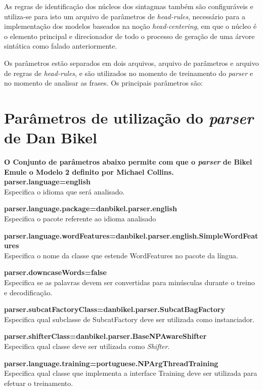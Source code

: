 As regras de identificação dos núcleos dos sintagmas também são configuráveis e utiliza-se para isto um arquivo de parâmetros de \emph{head-rules}, necessário para a implementação dos modelos baseados na noção \emph{head-centering}, em que o núcleo é o elemento principal e direcionador de todo o processo de geração de uma árvore sintática como falado anteriormente.

Os parâmetros estão separados em dois arquivos, arquivo de parâmetros e arquivo de regras de \emph{head-rules}, e são utilizados no momento de treinamento do \emph{parser} e no momento de analisar as frases. Os principais parâmetros são:

\section{Parâmetros de utilização do \emph{parser} de Dan Bikel}
\label{sec:bikelest_param}

\scriptsize

\textbf{O Conjunto de parâmetros abaixo permite com que o \emph{parser} de Bikel Emule o Modelo 2 definito por Michael Collins.}\\

\textbf{parser.language=english}\\
Especifica o idioma que será analisado.

\textbf{parser.language.package=danbikel.parser.english}\\
Especifica o pacote referente ao idioma analisado

\textbf{parser.language.wordFeatures=danbikel.parser.english.SimpleWordFeatures}\\
Especifica o nome da classe que estende WordFeatures no pacote da língua.

\textbf{parser.downcaseWords=false}\\
Especifica se as palavras devem ser convertidas para minúsculas durante o treino e decodificação.

\textbf{parser.subcatFactoryClass=danbikel.parser.SubcatBagFactory}\\
Especifica qual subclasse de SubcatFactory deve ser utilizada como instanciador.

\textbf{parser.shifterClass=danbikel.parser.BaseNPAwareShifter}\\
Especifica qual classe deve ser utilizada como \emph{Shifter}.

\textbf{parser.language.training=portuguese.NPArgThreadTraining}\\
Especifica qual classe que implementa a interface Training deve ser utilizada para efetuar o treinamento.

